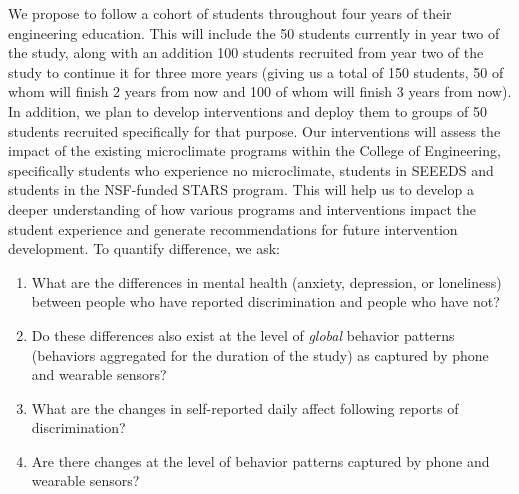 We propose to follow a cohort of students throughout four years of their engineering education. This will include the 50 students currently in year two of the study, along with an addition 100 students recruited from year two of the study to continue it for three more years (giving us a total of 150 students, 50 of whom will finish 2 years from now and 100 of whom will finish 3 years from now). In addition, we plan to develop interventions and deploy them to groups of 50 students recruited specifically for that purpose. Our interventions will assess the impact of the existing microclimate programs within the College of Engineering, specifically students who experience no microclimate, students in SEEEDS and students in the NSF-funded STARS program.  This will help us to develop a deeper understanding of how various programs and interventions impact the student experience and generate recommendations for future intervention development.
To quantify difference, we ask: %

\begin{enumerate}[start=1,label={\bfseries RQ\arabic*}, leftmargin=1cm]
    \item \label{itm:rq-long-outcome} What are the differences in mental health (\eg anxiety, depression, or loneliness) between people who have reported discrimination and people who have not?
    \item \label{itm:rq-long-behavior} Do these differences also exist at the level of \textit{global} behavior patterns (\ie behaviors aggregated for the duration of the study) as captured by phone and wearable sensors?
    \item \label{itm:rq-short-outcome} What are the changes in self-reported daily affect following reports of discrimination? %
    \item \label{itm:rq-short-behavior} Are there changes at the level of behavior patterns captured by phone and wearable sensors?
\end{enumerate}

